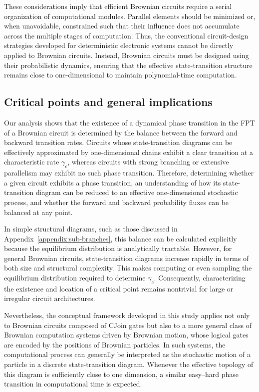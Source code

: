 \documentclass[%
 reprint,
superscriptaddress,
 amsmath,amssymb,
 aps,
 prx,
]{revtex4-2}
\begin{document}
These considerations imply that efficient Brownian circuits require a serial organization of computational modules. Parallel elements should be minimized or, when unavoidable, constrained such that their influence does not accumulate across the multiple stages of computation. Thus, the conventional circuit-design strategies developed for deterministic electronic systems cannot be directly applied to Brownian circuits. Instead, Brownian circuits must be designed using their probabilistic dynamics, ensuring that the effective state-transition structure remains close to one-dimensional to maintain polynomial-time computation. 

\subsection{Critical points and general implications}
Our analysis shows that the existence of a dynamical phase transition in the FPT of a Brownian circuit is determined by the balance between the forward and backward transition rates. Circuits whose state-transition diagrams can be effectively approximated by one-dimensional chains exhibit a clear transition at a characteristic rate $\gamma_c$, whereas circuits with strong branching or extensive parallelism may exhibit no such phase transition. Therefore, determining whether a given circuit exhibits a phase transition, an understanding of how its state-transition diagram can be reduced to an effective one-dimensional stochastic process, and whether the forward and backward probability fluxes can be balanced at any point. 

In simple structural diagrams, such as those discussed in Appendix~\ref {appendix:sub-branches}, this balance can be calculated explicitly because the equilibrium distribution is analytically tractable. However, for general Brownian circuits, state-transition diagrams increase rapidly in terms of both size and structural complexity. This makes computing or even sampling the equilibrium distribution required to determine $\gamma_c$. Consequently, characterizing the existence and location of a critical point remains nontrivial for large or irregular circuit architectures. 

Nevertheless, the conceptual framework developed in this study applies not only to Brownian circuits composed of CJoin gates but also to a more general class of Brownian computation systems driven by Brownian motion, whose logical gates are encoded by the positions of Brownian particles. In such systems, the computational process can generally be interpreted as the stochastic motion of a particle in a discrete state-transition diagram.  Whenever the effective topology of this diagram is sufficiently close to one dimension, a similar easy--hard phase transition in computational time is expected. 
\end{document}
